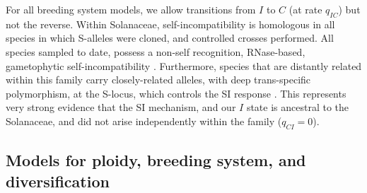 For all breeding system models, we allow transitions from $I$ to $C$ (at rate $q_{IC}$) but not the reverse.
Within Solanaceae, self-incompatibility is homologous in all species in which S-alleles were cloned, and controlled crosses performed.  
All species sampled to date, possess a non-self recognition, RNase-based, gametophytic self-incompatibility \citep[shared even with other euasterid families;][]{ramanauskas_2017}.
Furthermore, species that are distantly related within this family carry closely-related alleles, with deep trans-specific polymorphism, at the S-locus, which controls the SI response \citep{ioerger_1990, igic_2006}. %
This represents very strong evidence that the SI mechanism, and our $I$ state is ancestral to the Solanaceae, and did not arise independently within the family ($q_{CI}=0$). %
%

\subsection{Models for ploidy, breeding system, and diversification}

